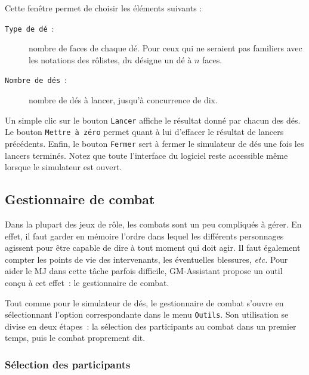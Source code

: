 \documentclass[a4paper,12pt]{article}
\newcommand*{\GMA}{GM-Assistant\xspace}
\newcommand*{\interfaceitem}[1]{\texttt{#1}}
\begin{document}
Cette fenêtre permet de choisir les éléments suivants :
\begin{description}
    \item[\interfaceitem{Type de dé}~:]{nombre de faces de chaque dé. Pour ceux qui ne seraient pas familiers avec les notations des rôlistes, d$n$ désigne un dé à $n$ faces.}
    \item[\interfaceitem{Nombre de dés}~:]{nombre de dés à lancer, jusqu'à concurrence de dix.}
\end{description}
Un simple clic sur le bouton \interfaceitem{Lancer} affiche le résultat donné par chacun des dés.
Le bouton \interfaceitem{Mettre à zéro} permet quant à lui d'effacer le résultat de lancers précédents.
Enfin, le bouton \interfaceitem{Fermer} sert à fermer le simulateur de dés une fois les lancers terminés.
Notez que toute l'interface du logiciel reste accessible même lorsque le simulateur est ouvert.

\subsection{Gestionnaire de combat}
\label{sec:combat}

Dans la plupart des jeux de rôle, les combats sont un peu compliqués à gérer.
En effet, il faut garder en mémoire l'ordre dans lequel les différents personnages agissent pour être capable de dire à tout moment qui doit agir.
Il faut également compter les points de vie des intervenants, les éventuelles blessures, \emph{etc.}
Pour aider le MJ dans cette tâche parfois difficile, \GMA propose un outil conçu à cet effet~: le gestionnaire de combat.

Tout comme pour le simulateur de dés, le gestionnaire de combat s'ouvre en sélectionnant l'option correspondante dans le menu \interfaceitem{Outils}.
Son utilisation se divise en deux étapes~: la sélection des participants au combat dans un premier temps, puis le combat proprement dit.

\subsubsection{Sélection des participants}
\end{document}
